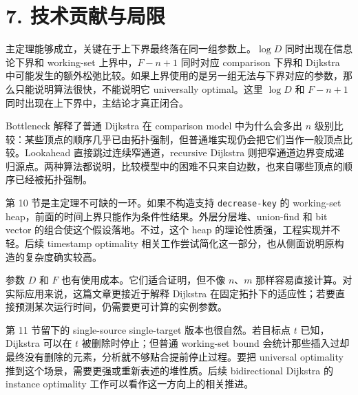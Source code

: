 \section*{7. 技术贡献与局限}
主定理能够成立，关键在于上下界最终落在同一组参数上。\(\log D\) 同时出现在信息论下界和 working-set 上界中，\(F-n+1\) 同时对应 comparison 下界和 Dijkstra 中可能发生的额外松弛比较。如果上界使用的是另一组无法与下界对应的参数，那么只能说明算法很快，不能说明它 universally optimal。这里 \(\log D\) 和 \(F-n+1\) 同时出现在上下界中，主结论才真正闭合。

Bottleneck 解释了普通 Dijkstra 在 comparison model 中为什么会多出 \(n\) 级别比较：某些顶点的顺序几乎已由拓扑强制，但普通堆实现仍会把它们当作一般顶点比较。Lookahead 直接跳过连续窄通道，recursive Dijkstra 则把窄通道边界变成递归源点。两种算法都说明，比较模型中的困难不只来自边数，也来自哪些顶点的顺序已经被拓扑强制。

第 10 节是主定理不可缺的一环。如果不构造支持 \texttt{decrease-\allowbreak{}key} 的 working-set heap，前面的时间上界只能作为条件性结果。外层分层堆、union-find 和 bit vector 的组合使这个假设落地。不过，这个 heap 的理论性质强，工程实现并不轻。后续 timestamp optimality 相关工作尝试简化这一部分，也从侧面说明原构造的复杂度确实较高。

参数 \(D\) 和 \(F\) 也有使用成本。它们适合证明，但不像 \(n\)、\(m\) 那样容易直接计算。对实际应用来说，这篇文章更接近于解释 Dijkstra 在固定拓扑下的适应性；若要直接预测某次运行时间，仍需要更可计算的实例参数。

第 11 节留下的 single-source single-target 版本也很自然。若目标点 \(t\) 已知，Dijkstra 可以在 \(t\) 被删除时停止；但普通 working-set bound 会统计那些插入过却最终没有删除的元素，分析就不够贴合提前停止过程。要把 universal optimality 推到这个场景，需要更强或重新表述的堆性质。后续 bidirectional Dijkstra 的 instance optimality 工作可以看作这一方向上的相关推进。